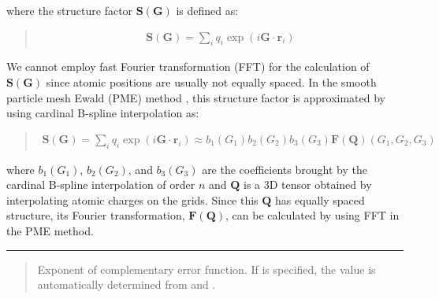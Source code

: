 \documentclass[a4paper,11pt,oneside,english]{sphinxmanual}
\begin{document}
where the structure factor \(\mathbf{S}(\mathbf{G})\) is defined as:
\begin{quote}

\vspace{-5mm}
\begin{equation*}
\begin{split}\mathbf{S}(\mathbf{G})=\sum_i q_i \exp(i\mathbf{G} \cdot \mathbf{r}_i)\end{split}
\end{equation*}\end{quote}

We cannot employ fast Fourier transformation (FFT) for the calculation of
\(\mathbf{S}(\mathbf{G})\) since atomic positions are usually not
equally spaced. In the smooth particle mesh Ewald (PME) method
 , this structure factor is
approximated by using cardinal B-spline interpolation as:
\begin{quote}

\vspace{-5mm}
\begin{equation*}
\begin{split}\mathbf{S}(\mathbf{G})=\sum_i q_i \exp(i\mathbf{G} \cdot \mathbf{r}_i) \approx b_1(G_1)b_2(G_2)b_3(G_3)\mathbf{F}(\mathbf{Q})(G_1,G_2,G_3)\end{split}
\end{equation*}
\vspace{-3mm}
\end{quote}

where \(b_1(G_1)\), \(b_2(G_2)\), and \(b_3(G_3)\) are
the coefficients brought by the cardinal B-spline interpolation of order
\(n\) and \(\mathbf{Q}\) is a 3D tensor obtained by interpolating
atomic charges on the grids.
Since this \(\mathbf{Q}\) has equally spaced structure, its Fourier
transformation, \(\mathbf{F}(\mathbf{Q})\), can be calculated by using
FFT in the PME method.


\bigskip\hrule\bigskip


 
\begin{quote}


Exponent of complementary error function.
If  is specified,
the value is automatically determined from  and .

\end{quote}
\end{document}
